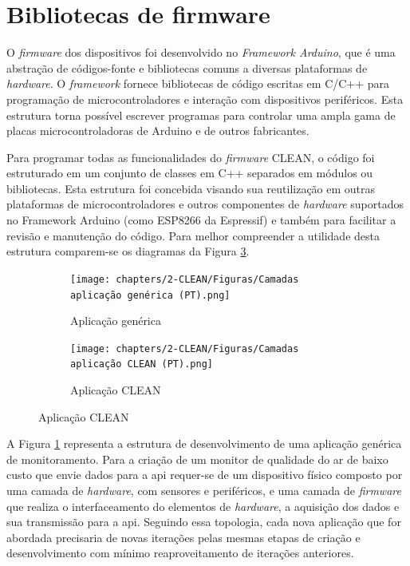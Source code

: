 \section{Bibliotecas de firmware}

O \textit{firmware} dos dispositivos foi desenvolvido no \textit{Framework Arduino}, que é uma abstração de códigos-fonte e bibliotecas comuns a diversas plataformas de \textit{\textit{hardware}}. O \textit{framework} fornece bibliotecas de código escritas em C/C++ para programação de microcontroladores e interação com dispositivos periféricos. Esta estrutura torna possível escrever programas para controlar uma ampla gama de placas microcontroladoras de Arduino e de outros fabricantes.

Para programar todas as funcionalidades do \textit{firmware} CLEAN, o código foi estruturado em um conjunto de classes em C++ separados em módulos ou bibliotecas. Esta estrutura foi concebida visando sua reutilização em outras plataformas de microcontroladores e outros componentes de \textit{hardware} suportados no Framework Arduino (como ESP8266 da Espressif) e também para facilitar a revisão e manutenção do código. Para melhor compreender a utilidade desta estrutura comparem-se os diagramas da Figura \ref{fig:application-structure}.

\begin{figure}[t]
    \centering
    \caption{Estrutura de desenvolvimento de aplicação de monitoramento de baixo custo}
    \begin{subfigure}{0.40\textwidth}
        \texttt{[image: chapters/2-CLEAN/Figuras/Camadas aplicação genérica (PT).png]}
        \caption{Aplicação genérica}
        \label{fig:application-structure-generic}
    \end{subfigure}
    \hfill
    \begin{subfigure}{0.40\textwidth}
        \texttt{[image: chapters/2-CLEAN/Figuras/Camadas aplicação CLEAN (PT).png]}
        \caption{Aplicação CLEAN}
        \label{fig:application-structure-clean}
    \end{subfigure}
    \hfill
    \label{fig:application-structure}
\end{figure}

A Figura \ref{fig:application-structure-generic} representa a estrutura de desenvolvimento de uma aplicação genérica de monitoramento. Para a criação de um monitor de qualidade do ar de baixo custo que envie dados para a \acrshort{api} requer-se de um dispositivo físico composto por uma camada de \textit{hardware}, com sensores e periféricos, e uma camada de \textit{firmware} que realiza o interfaceamento do elementos de \textit{hardware}, a aquisição dos dados e sua transmissão para a \acrshort{api}. Seguindo essa topologia, cada nova aplicação que for abordada precisaria de novas iterações pelas mesmas etapas de criação e desenvolvimento com mínimo reaproveitamento de iterações anteriores.

